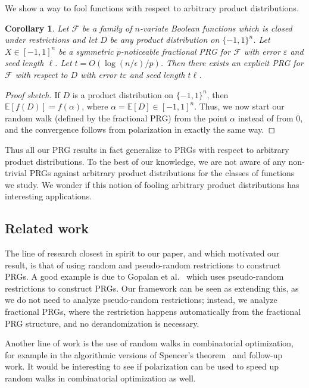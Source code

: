 \documentclass[11pt]{article}
\numberwithin{equation}{section}
\newtheorem{corollary}[theorem]{Corollary}
\theoremstyle{definition}
\theoremstyle{plain}
\newcommand{\E}{\mathbb{E}}
\newcommand{\FF}{\mathcal{F}}
\newcommand{\eps}{\varepsilon}
\newcommand{\zero}{\overline{0}}
\begin{document}
We show a way to fool functions with respect to arbitrary product distributions.
\begin{corollary}
\label{cor:arbitrary_product_fool}
Let $\FF$ be a family of $n$-variate Boolean functions which is closed under restrictions and let $D$ be any product distribution on $\{-1,1 \}^n$.
Let $X \in [-1,1]^n$ be a symmetric $p$-noticeable fractional PRG for $\FF$ with error $\eps$ and seed length $\ell$. Let $t= O(\log(n/\epsilon)/p)$. Then there exists an explicit  PRG for $\FF$ with respect to $D$ with error $t\eps$ and seed length $t \ell$.
\end{corollary}
\begin{proof}[Proof sketch]If $D$ is a product distribution on $\{-1,1\}^n$, then $\E[f(D)] = f(\alpha)$, where $\alpha=\E[D] \in [-1,1]^{n}$. Thus, we now start our random walk (defined by the fractional PRG) from the point $\alpha$ instead of from $\zero$, and the convergence follows from polarization in exactly the same way.
\end{proof}
Thus all our PRG results in fact generalize to PRGs with respect to arbitrary product distributions. To the best of our knowledge, we are not aware of any non-trivial PRGs against arbitrary product distributions  for the classes of functions we study. We wonder if this notion of fooling arbitrary product distributions has interesting applications.

%
\subsection{Related work}
%
%
The line of research closest in spirit to our paper, and which motivated our result, is that of using random and pseudo-random restrictions
%
%
to construct PRGs. A good example is due to Gopalan et al.~\cite{gopalan2012better} which uses pseudo-random restrictions to construct PRGs. Our framework
can be seen as extending this, as we do not need to analyze pseudo-random restrictions; instead, we analyze fractional PRGs, where the restriction
happens automatically from the fractional PRG structure, and no derandomization is necessary.

Another line of work is the use of random walks in combinatorial optimization, for example in the algorithmic versions of Spencer's theorem~\cite{bansal2010constructive,lovett2012constructive} and
%
follow-up work.     %
It would be interesting to see if polarization can be used
to speed up random walks in combinatorial optimization as well.
\end{document}
